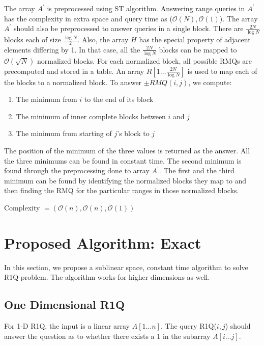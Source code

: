 \documentclass{article}
\begin{document}
The array $A^\prime$ is preprocessed using ST algorithm. Answering range queries in $A^\prime$ has the complexity in extra space and query time as ($\mathcal{O}(N), \mathcal{O}(1)$). The array $A^\prime$ should also be preprocessed to answer queries in a single block. There are $\frac{2N}{\log N}$ blocks each of size $\frac{\log N}{2}$. Also, the array $H$ has the special property of adjacent elements differing by 1. In that case, all the $\frac{2N}{\log N}$ blocks can be mapped to $\mathcal{O}(\sqrt N)$ normalized blocks. For each normalized block, all possible RMQs are precomputed and stored in a table. An array $R[1 \ldots \frac{2N}{\log N}]$ is used to map each of the blocks to a normalized block. To answer $\pm RMQ(i, j)$, we compute:
\begin{enumerate}
\item The minimum from $i$ to the end of its block
\item The minimum of inner complete blocks between $i$ and $j$
\item The minimum from starting of $j$'s block to $j$
\end{enumerate} 

The position of the minimum of the three values is returned as the answer. All the three minimums can be found in constant time. The second minimum is found through the preprocessing done to array $A^\prime$. The first and the third minimum can be found by identifying the normalized blocks they map to and then finding the RMQ for the particular ranges in those normalized blocks.

Complexity $= (\mathcal{O}(n), \mathcal{O}(n), \mathcal{O}(1))$

\section{Proposed Algorithm: Exact}
In this section, we propose a sublinear space, constant time algorithm to solve R1Q problem. The algorithm works for higher dimensions as well.

\subsection{One Dimensional R1Q}
For 1-D R1Q, the input is a linear array $A[1 \ldots n]$. The query R1Q($i, j$) should answer the question as to whether there exists a 1 in the subarray $A[i \ldots j]$.
\end{document}

